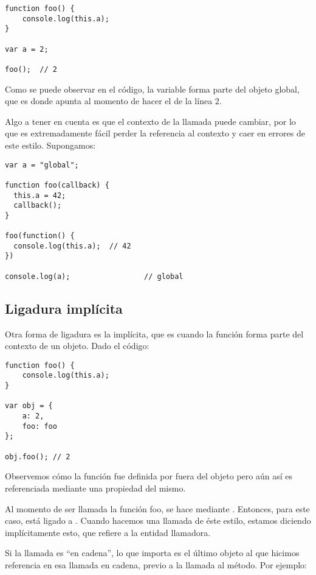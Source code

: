 \begin{lstlisting}[title={Ligadura por defecto}]
function foo() {
	console.log(this.a);
}

var a = 2;

foo();  // 2
\end{lstlisting}

Como se puede observar en el código, la variable  forma parte del objeto global, que es donde apunta  al momento de hacer el  de la línea 2.

Algo a tener en cuenta es que el contexto de la llamada puede cambiar, por lo que es extremadamente fácil perder la referencia al contexto y caer en errores de este estilo. Supongamos:

\begin{lstlisting}
var a = "global";

function foo(callback) {
  this.a = 42;
  callback();
}

foo(function() {
  console.log(this.a);	// 42
})

console.log(a);					// global
\end{lstlisting}

\subsection{Ligadura implícita}

Otra forma de ligadura es la implícita, que es cuando la función forma parte del contexto de un objeto. Dado el código:

\begin{lstlisting}[title={Ligadura implícita}]
function foo() {
	console.log(this.a);
}

var obj = {
	a: 2,
	foo: foo
};

obj.foo(); // 2
\end{lstlisting}

Observemos cómo la función  fue definida por fuera del objeto  pero aún así es referenciada mediante una propiedad del mismo.

Al momento de ser llamada la función foo, se hace mediante . Entonces, para este caso,  está ligado a . Cuando hacemos una llamada de éste estilo, estamos diciendo implícitamente esto, que  refiere a la entidad llamadora.

Si la llamada es "`en cadena"', lo que importa es el último objeto al que hicimos referencia en esa llamada en cadena, previo a la llamada al método. Por ejemplo:

